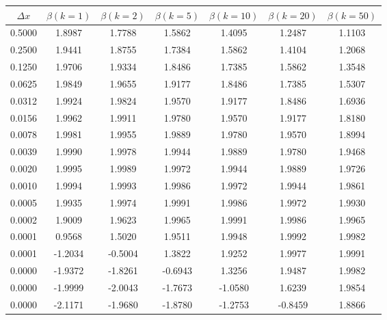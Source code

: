 \begin{tabular}{|c|c|c|c|c|c|c|}
\hline
\textbf{$\Delta x$}&\textbf{$\beta(k=1)$}&\textbf{$\beta(k=2)$}&\textbf{$\beta(k=5)$}&\textbf{$\beta(k=10)$}&\textbf{$\beta(k=20)$}&\textbf{$\beta(k=50)$}\\\hline
0.5000&1.8987&1.7788&1.5862&1.4095&1.2487&1.1103\\\hline
0.2500&1.9441&1.8755&1.7384&1.5862&1.4104&1.2068\\\hline
0.1250&1.9706&1.9334&1.8486&1.7385&1.5862&1.3548\\\hline
0.0625&1.9849&1.9655&1.9177&1.8486&1.7385&1.5307\\\hline
0.0312&1.9924&1.9824&1.9570&1.9177&1.8486&1.6936\\\hline
0.0156&1.9962&1.9911&1.9780&1.9570&1.9177&1.8180\\\hline
0.0078&1.9981&1.9955&1.9889&1.9780&1.9570&1.8994\\\hline
0.0039&1.9990&1.9978&1.9944&1.9889&1.9780&1.9468\\\hline
0.0020&1.9995&1.9989&1.9972&1.9944&1.9889&1.9726\\\hline
0.0010&1.9994&1.9993&1.9986&1.9972&1.9944&1.9861\\\hline
0.0005&1.9935&1.9974&1.9991&1.9986&1.9972&1.9930\\\hline
0.0002&1.9009&1.9623&1.9965&1.9991&1.9986&1.9965\\\hline
0.0001&0.9568&1.5020&1.9511&1.9948&1.9992&1.9982\\\hline
0.0001&-1.2034&-0.5004&1.3822&1.9252&1.9977&1.9991\\\hline
0.0000&-1.9372&-1.8261&-0.6943&1.3256&1.9487&1.9982\\\hline
0.0000&-1.9999&-2.0043&-1.7673&-1.0580&1.6239&1.9854\\\hline
0.0000&-2.1171&-1.9680&-1.8780&-1.2753&-0.8459&1.8866\\\hline
\end{tabular}

